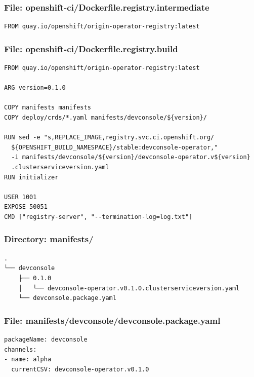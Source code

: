 \documentclass[aspectratio=169]{beamer}
\begin{document}
\begin{frame}[fragile]
  \frametitle{File: openshift-ci/Dockerfile.registry.intermediate}

  \begin{Verbatim}[fontsize=\small]
FROM quay.io/openshift/origin-operator-registry:latest
  \end{Verbatim}
\end{frame}

\begin{frame}[fragile]
  \frametitle{File: openshift-ci/Dockerfile.registry.build}

  \begin{Verbatim}[fontsize=\small]
FROM quay.io/openshift/origin-operator-registry:latest

ARG version=0.1.0

COPY manifests manifests
COPY deploy/crds/*.yaml manifests/devconsole/${version}/

RUN sed -e "s,REPLACE_IMAGE,registry.svc.ci.openshift.org/
  ${OPENSHIFT_BUILD_NAMESPACE}/stable:devconsole-operator,"
  -i manifests/devconsole/${version}/devconsole-operator.v${version}
  .clusterserviceversion.yaml
RUN initializer

USER 1001
EXPOSE 50051
CMD ["registry-server", "--termination-log=log.txt"]
  \end{Verbatim}
\end{frame}

\begin{frame}[fragile]

  \frametitle{Directory: manifests/}
  
  \begin{Verbatim}[fontsize=\small]
.
└── devconsole
    ├── 0.1.0
    │   └── devconsole-operator.v0.1.0.clusterserviceversion.yaml
    └── devconsole.package.yaml
  \end{Verbatim}
\end{frame}


\begin{frame}[fragile]

  \frametitle{File: manifests/devconsole/devconsole.package.yaml}
  
  \begin{Verbatim}[fontsize=\small]
packageName: devconsole
channels:
- name: alpha
  currentCSV: devconsole-operator.v0.1.0
  \end{Verbatim}
\end{frame}
\end{document}
